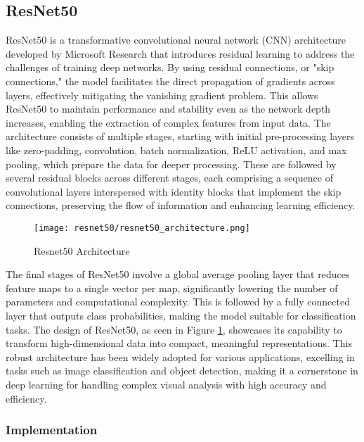 \subsection{ResNet50}\label{s:resnet50}

ResNet50 \cite{He_Zhang_Ren_Sun_2015} is a transformative convolutional neural network (CNN) architecture developed by Microsoft Research that introduces residual learning to address the challenges of training deep networks. By using residual connections, or "skip connections," the model facilitates the direct propagation of gradients across layers, effectively mitigating the vanishing gradient problem. This allows ResNet50 to maintain performance and stability even as the network depth increases, enabling the extraction of complex features from input data. The architecture consists of multiple stages, starting with initial pre-processing layers like zero-padding, convolution, batch normalization, ReLU activation, and max pooling, which prepare the data for deeper processing. These are followed by several residual blocks across different stages, each comprising a sequence of convolutional layers interspersed with identity blocks that implement the skip connections, preserving the flow of information and enhancing learning efficiency.

\begin{figure}[H]
  \begin{center}
    \texttt{[image: resnet50/resnet50\_architecture.png]}
  \end{center}
  \caption{Resnet50 Architecture}\label{f:resnet50_architecture}
\end{figure}

The final stages of ResNet50 involve a global average pooling layer that reduces feature maps to a single vector per map, significantly lowering the number of parameters and computational complexity. This is followed by a fully connected layer that outputs class probabilities, making the model suitable for classification tasks. The design of ResNet50, as seen in Figure \ref{f:resnet50_architecture}, showcases its capability to transform high-dimensional data into compact, meaningful representations. This robust architecture has been widely adopted for various applications, excelling in tasks such as image classification and object detection, making it a cornerstone in deep learning for handling complex visual analysis with high accuracy and efficiency.

\subsubsection{Implementation}

